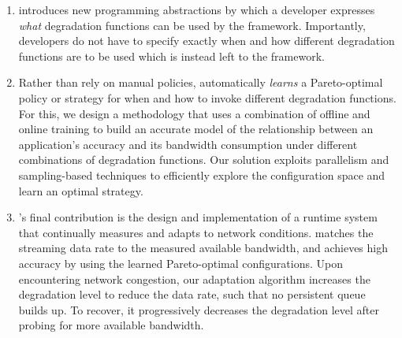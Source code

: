 \begin{enumerate}[leftmargin=*]
\item \sysname{} introduces new programming abstractions by which a developer
  expresses \emph{what} degradation functions can be used by the framework.
  Importantly, developers do not have to specify exactly when and how different
  degradation functions are to be used which is instead left to the \sysname{}
  framework.

\item Rather than rely on manual policies, \sysname{} automatically
  \emph{learns} a Pareto-optimal policy or strategy for when and how to invoke
  different degradation functions.  For this, we design a methodology that uses
  a combination of offline and online training to build an accurate model of the
  relationship between an application's accuracy and its bandwidth consumption
  under different combinations of degradation functions. Our solution exploits
  parallelism and sampling-based techniques to efficiently explore the
  configuration space and learn an optimal strategy.


\item \sysname{}'s final contribution is the design and implementation of a
  runtime system that continually measures and adapts to network conditions.
  \sysname{} matches the streaming data rate to the measured available
  bandwidth, and achieves high accuracy by using the learned Pareto-optimal
  configurations.  Upon encountering network congestion, our adaptation
  algorithm increases the degradation level to reduce the data rate, such that
  no persistent queue builds up. To recover, it progressively decreases the
  degradation level after probing for more available bandwidth.


\end{enumerate}

